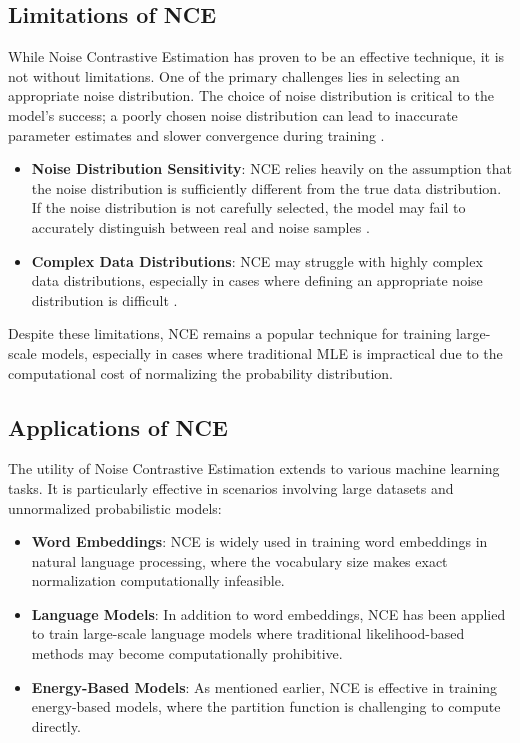 \subsection{Limitations of NCE}

While Noise Contrastive Estimation has proven to be an effective technique, it is not without limitations. One of the primary challenges lies in selecting an appropriate noise distribution. The choice of noise distribution is critical to the model's success; a poorly chosen noise distribution can lead to inaccurate parameter estimates and slower convergence during training \citep{10.48550/arxiv.2110.11271}.

\begin{itemize}
    \item \textbf{Noise Distribution Sensitivity}: NCE relies heavily on the assumption that the noise distribution is sufficiently different from the true data distribution. If the noise distribution is not carefully selected, the model may fail to accurately distinguish between real and noise samples \citep{10.48550/arxiv.2110.11271}.
    \item \textbf{Complex Data Distributions}: NCE may struggle with highly complex data distributions, especially in cases where defining an appropriate noise distribution is difficult \citep{10.48550/arxiv.2110.11271}.
\end{itemize}

Despite these limitations, NCE remains a popular technique for training large-scale models, especially in cases where traditional MLE is impractical due to the computational cost of normalizing the probability distribution.

\subsection{Applications of NCE}

The utility of Noise Contrastive Estimation extends to various machine learning tasks. It is particularly effective in scenarios involving large datasets and unnormalized probabilistic models:
\begin{itemize}
    \item \textbf{Word Embeddings}: NCE is widely used in training word embeddings in natural language processing, where the vocabulary size makes exact normalization computationally infeasible.
    \item \textbf{Language Models}: In addition to word embeddings, NCE has been applied to train large-scale language models where traditional likelihood-based methods may become computationally prohibitive.
    \item \textbf{Energy-Based Models}: As mentioned earlier, NCE is effective in training energy-based models, where the partition function is challenging to compute directly.
\end{itemize}

